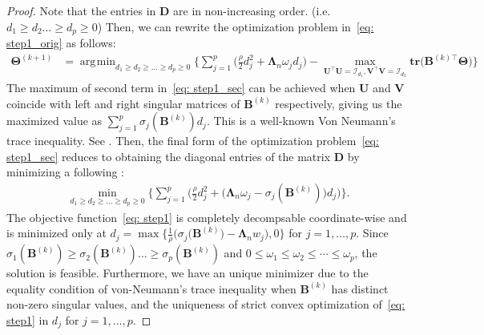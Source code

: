 \documentclass[12pt]{article}
\DeclareMathOperator*{\argmin}{\arg\!\min}
\begin{document}
\begin{proof}
Note that the entries in $\boldsymbol{D}$ are in non-increasing order. (i.e. $d_{1} \geq d_{2} \dots \geq d_{p} \geq 0$)
Then, we can rewrite the optimization problem in~\eqref{eq: step1_orig} as follows:
\begin{align}
    \boldsymbol{\Theta}^{(k+1)} 
    &= \argmin_{d_{1}\geq d_{2}\geq \dots \geq d_{p} \geq 0 }\bigg\{ \sum_{j=1}^{p} \bigg( \frac{\rho}{2} d_{j}^{2} + \boldsymbol{\Lambda}_{n}\omega_{j}d_{j} \bigg) - \max_{\boldsymbol{U}^{\top}\boldsymbol{U} = \mathcal{I}_{d_{1}}, \boldsymbol{V}^{\top}\boldsymbol{V} = \mathcal{I}_{d_{2}}} \textbf{tr}\big(\boldsymbol{B}^{(k)\top}\boldsymbol{\Theta}\big) \bigg\} \label{eq: step1_sec} 
\end{align}
The maximum of second term in~\eqref{eq: step1_sec} can be achieved when $\boldsymbol{U}$ and $\boldsymbol{V}$ coincide with 
left and right singular matrices of $\boldsymbol{B}^{(k)}$ respectively, giving us the maximized value as $\sum_{j=1}^{p}\sigma_{j}(\boldsymbol{B}^{(k)})d_{j}$.
This is a well-known Von Neumann's trace inequality.
See \cite{von1937some,mirsky1975trace}. 
Then, the final form of the optimization problem~\eqref{eq: step1_sec} reduces to obtaining the diagonal entries of the matrix $\boldsymbol{D}$ by minimizing a following : 
\begin{align}
    \min_{d_{1}\geq d_{2}\geq \dots \geq d_{p} \geq 0 }\bigg\{ \sum_{j=1}^{p} \bigg( \frac{\rho}{2} d_{j}^{2} + \big( \boldsymbol{\Lambda}_{n} \omega_{j}-\sigma_{j}(\boldsymbol{B}^{(k)}) \big) d_{j} \bigg)  \bigg\}. \label{eq: step1}
\end{align}
The objective function~\eqref{eq: step1} is completely decompsable coordinate-wise and is minimized only at $d_{j}=\max\big\{\frac{1}{\rho}\big(\sigma_{j}(\boldsymbol{B}^{(k)}\big)-\boldsymbol{\Lambda}_{n} w_{j}\big),0 \big\}$ for $j=1,\dots,p$.
Since $\sigma_{1}(\boldsymbol{B}^{(k)})\geq\sigma_{2}(\boldsymbol{B}^{(k)})\dots\geq\sigma_{p}(\boldsymbol{B}^{(k)})$ and $0\leq\omega_{1}\leq\omega_{2}\leq\cdots\leq\omega_{p}$, the solution is feasible.
Furthermore, we have an unique minimizer due to the equality condition of von-Neumann's trace inequality when $\boldsymbol{B}^{(k)}$ has distinct non-zero singular values, and the uniqueness of strict convex optimization  of~\eqref{eq: step1} in $d_{j}$ for $j=1,\dots,p$.
\end{proof}
\end{document}
